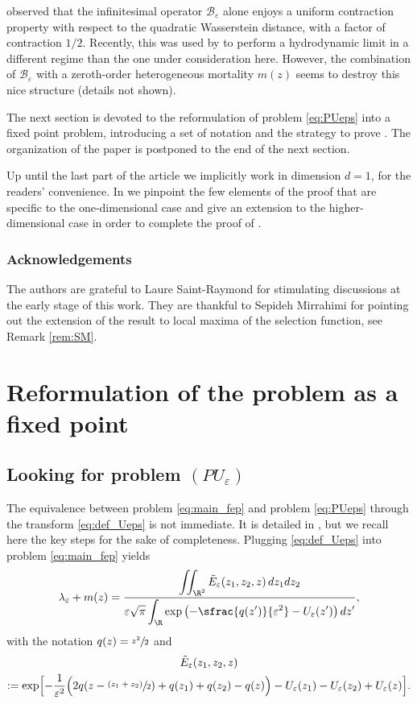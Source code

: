 \documentclass[10pt]{amsart}
\let\mathcal\mathscr
\newcommand{\psfrac}[2]{\sfrac{(#1)}{#2}}
\newcommand{\cB}{\mathcal{B}}
\theoremstyle{plain}
\theoremstyle{definition}
\let\eps\varepsilon
\begin{document}
\cite{raoulmirrahimiinfinitesimal} observed that the infinitesimal operator $\cB_\eps$ alone enjoys a uniform contraction property with respect to the quadratic Wasserstein distance, with a factor of contraction $1/2$. Recently, this was used by \cite{magal-raoul} to perform a hydrodynamic limit in a different regime than the one under consideration here. However, the combination of $\cB_\eps$ with a zeroth-order heterogeneous mortality $m(z)$ seems to destroy this nice structure (details not shown).

The next section is devoted to the reformulation of problem \eqref{eq:PUeps} into a fixed point problem, introducing a set of notation and the strategy to prove . The organization of the paper is postponed to the end of the next section.

Up until the last part of the article we implicitly work in dimension $d=1$, for the readers' convenience. In  we pinpoint the few elements of the proof that are specific to the one-dimensional case and give an extension to the higher-dimensional case in order to complete the proof of .

\subsubsection*{Acknowledgements} The authors are grateful to Laure Saint-Raymond for stimulating discussions at the early stage of this work. They are thankful to Sepideh Mirrahimi for pointing out the extension of the result to local maxima of the selection function, see Remark \ref{rem:SM}.

\section{Reformulation of the problem as a fixed point}\label{sec reformulation}
\subsection{Looking for problem $(PU_\eps)$}
\label{sec:reformulation1}
The equivalence between problem \eqref{eq:main_fep} and problem \eqref{eq:PUeps} through the transform \eqref{eq:def_Ueps} is not immediate. It is detailed in \cite{main}, but we recall here the key steps for the sake of completeness. Plugging \eqref{eq:def_Ueps} into problem \eqref{eq:main_fep} yields
\[
\lambda_\eps + m(z)
= \dfrac{\displaystyle \iint_{\R^2} \tilde{E}_\eps(z_1,z_2,z)\, d z_1 d z_2}{\displaystyle
\eps \sqrt{\pi} \int_\R \exp \left(-\sfrac{q(z')}{\eps^2} - U_\eps(z') \right) d z'},
\]
with the notation $q(z)=\sfrac{z^2}{2}$ and
\begin{multline*}
\tilde{E}_\eps(z_1,z_2,z)\\
:=\exp\Bigl[-\dfrac1{\eps^2} \Bigl(2 q(z-\psfrac{z_1+z_2}{2}) + q(z_1) + q(z_2) - q(z) \Bigr) - U_\eps(z_1) - U_\eps(z_2) + U_\eps(z) \Bigr].
\end{multline*}
\end{document}
